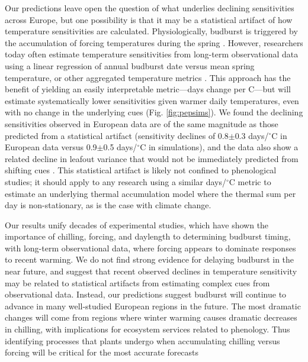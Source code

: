 \documentclass{article}
\begin{document}
\par Our predictions leave open the question of what underlies declining sensitivities across Europe, but one possibility is that it may be a statistical artifact of how temperature sensitivities are calculated. Physiologically, budburst is triggered by the accumulation of forcing temperatures during the spring \emph{\citep{chuine2016,hanninen1995}}. However, researchers today often estimate temperature sensitivities from long-term observational data using a linear regression of annual budburst date versus mean spring temperature, or other aggregated temperature metrics \emph{\citep[e.g.,][]{Wolkovich:2012n}}. This approach has the benefit of yielding an easily interpretable metric---days change per \degree C---but will estimate systematically lower sensitivities given warmer daily temperatures, even with no change in the underlying cues (Fig. \ref{fig:pepsims}). We found the declining sensitivities observed in European data are of the same magnitude as those predicted from a statistical artifact (sensitivity declines of 0.8$\pm$0.3 days/$^{\circ}$C in European data versus 0.9$\pm$0.5 days/$^{\circ}$C in simulations), and the data also show a related decline in leafout variance that would not be immediately predicted from shifting cues \emph{\citep[{\normalfont see} Potential statistical artifacts in declines of temperature sensitivity in observational long-term data ][{\normalfont for further details}]{gusewell2017}}. This statistical artifact is likely not confined to phenological studies; it should apply to any research using a similar days/$^{\circ}$C metric to estimate an underlying thermal accumulation model where the thermal sum per day is non-stationary, as is the case with climate change. 

 \par Our results unify decades of experimental studies, which have shown the importance of chilling, forcing, and daylength to determining budburst timing, with long-term observational data, where forcing appears to dominate responses to recent warming. We do not find strong evidence for delaying budburst in the near future, and suggest that recent observed declines in temperature sensitivity may be related to statistical artifacts from estimating complex cues from observational data. Instead, our predictions suggest budburst will continue to advance in many well-studied European regions in the future. The most dramatic changes will come from regions where winter warming causes dramatic decreases in chilling, with implications for ecosystem services related to phenology. Thus identifying processes that plants undergo when accumulating chilling versus forcing will be critical for the most accurate forecasts \emph{\citep{chuine2016}}
\end{document}
